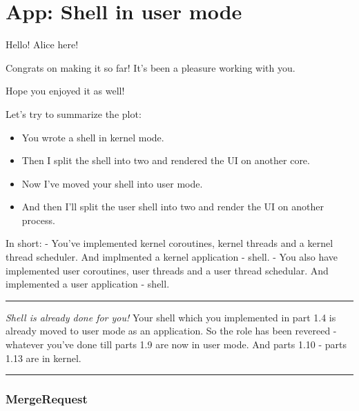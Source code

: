 \documentclass[]{book}
\newenvironment{Shaded}{}{}
\newcommand{\KeywordTok}[1]{\textbf{{#1}}}
\newcommand{\NormalTok}[1]{{#1}}
\begin{document}
\section*{App: Shell in user mode}\label{app-shell-in-user-mode}

Hello! Alice here!

Congrats on making it so far! It's been a pleasure working with you.

Hope you enjoyed it as well!

Let's try to summarize the plot:

\begin{itemize}
\itemsep1pt\parskip0pt
\item
  You wrote a shell in kernel mode.
\item
  Then I split the shell into two and rendered the UI on another core.
\item
  Now I've moved your shell into user mode.
\item
  And then I'll split the user shell into two and render the UI on
  another process.
\end{itemize}

In short: - You've implemented kernel coroutines, kernel threads and a
kernel thread scheduler. And implmented a kernel application - shell. -
You also have implemented user coroutines, user threads and a user
thread schedular. And implemented a user application - shell.

\begin{center}\rule{0.5\linewidth}{\linethickness}\end{center}

\emph{Shell is already done for you!} Your shell which you implemented
in part 1.4 is already moved to user mode as an application. So the role
has been revereed - whatever you've done till parts 1.9 are now in user
mode. And parts 1.10 - parts 1.13 are in kernel.

\begin{center}\rule{0.5\linewidth}{\linethickness}\end{center}

\subsubsection*{MergeRequest}\label{mergerequest-14}

\begin{Shaded}
\end{Shaded}
\end{document}
